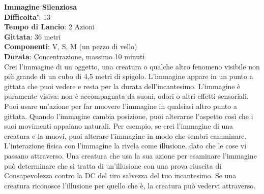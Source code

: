 \begin{multicols}{2}
\medskip\textbf{Immagine Silenziosa}\\
\textbf{Difficolta'}: 13\\
\textbf{Tempo di Lancio}: 2 Azioni\\
\textbf{Gittata}: 36 metri\\
\textbf{Componenti}: V, S, M (un pezzo di vello)\\
\textbf{Durata}: Concentrazione, massimo 10 minuti\\
Crei l’immagine di un oggetto, una creatura o qualche altro fenomeno visibile non più grande di un cubo di 4,5 metri di spigolo. L’immagine appare in un punto a gittata che puoi vedere e resta per la durata dell’incantesimo. L’immagine è puramente visiva; non è accompagnata da suoni, odori o altri effetti sensoriali. Puoi usare un’azione per far muovere l’immagine in qualsiasi altro punto a gittata. Quando l’immagine cambia posizione, puoi alterarne l’aspetto così che i suoi movimenti appaiano naturali. Per esempio, se crei l’immagine di una creatura e la muovi, puoi alterare l’immagine in modo che sembri camminare.\\
L’interazione fisica con l’immagine la rivela come illusione, dato che le cose vi passano attraverso. Una creatura che usa la sua azione per esaminare l’immagine può determinare che si tratta di un’illusione con una prova riuscita di Consapevolezza contro la DC del tiro salvezza del tuo incantesimo. Se una creatura riconosce l’illusione per quello che è, la creatura può vedervi attraverso.


\end{multicols}
